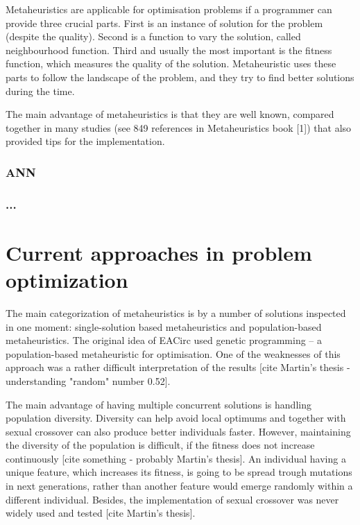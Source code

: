 \documentclass[
  print, %
  Table,   %
  nolof,     %
  nolot,     %
  draft, %
  11pt, %
  oneside  %
]{fithesis3}
\begin{document}
Metaheuristics are applicable for optimisation problems if a programmer can provide three crucial parts. First is an instance of solution for the problem (despite the quality). Second is a function to vary the solution, called neighbourhood function. Third and usually the most important is the fitness function, which measures the quality of the solution. Metaheuristic uses these parts to follow the landscape of the problem, and they try to find better solutions during the time.

The main advantage of metaheuristics is that they are well known, compared together in many studies (see 849 references in Metaheuristics book [1]) that also provided tips for the implementation.

\subsection{ANN}

\subsection{...}

\chapter{Current approaches in problem optimization}

The main categorization of metaheuristics is by a number of solutions inspected in one moment: single-solution based metaheuristics and population-based metaheuristics. The original idea of EACirc used genetic programming -- a population-based metaheuristic for optimisation. One of the weaknesses of this approach was a rather difficult interpretation of the results [cite Martin's thesis - understanding "random" number 0.52].

The main advantage of having multiple concurrent solutions is handling population diversity. Diversity can help avoid local optimums and together with sexual crossover can also produce better individuals faster. However, maintaining the diversity of the population is difficult, if the fitness does not increase continuously [cite something - probably Martin's thesis]. An individual having a unique feature, which increases its fitness, is going to be spread trough mutations in next generations, rather than another feature would emerge randomly within a different individual. Besides, the implementation of sexual crossover was never widely used and tested [cite Martin's thesis].
\end{document}
